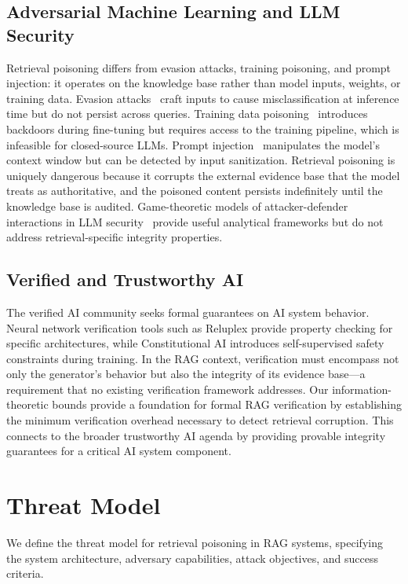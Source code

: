 \documentclass[journal,10pt]{IEEEtran}
\begin{document}
\subsection{Adversarial Machine Learning and LLM Security}
Retrieval poisoning differs from evasion attacks, training poisoning, and prompt injection: it operates on the knowledge base rather than model inputs, weights, or training data. Evasion attacks~\cite{r31} craft inputs to cause misclassification at inference time but do not persist across queries. Training data poisoning~\cite{r32} introduces backdoors during fine-tuning but requires access to the training pipeline, which is infeasible for closed-source LLMs. Prompt injection~\cite{r33} manipulates the model's context window but can be detected by input sanitization. Retrieval poisoning is uniquely dangerous because it corrupts the external evidence base that the model treats as authoritative, and the poisoned content persists indefinitely until the knowledge base is audited. Game-theoretic models of attacker-defender interactions in LLM security~\cite{r34} provide useful analytical frameworks but do not address retrieval-specific integrity properties.

\subsection{Verified and Trustworthy AI}
The verified AI community seeks formal guarantees on AI system behavior. Neural network verification tools such as Reluplex provide property checking for specific architectures, while Constitutional AI introduces self-supervised safety constraints during training. In the RAG context, verification must encompass not only the generator's behavior but also the integrity of its evidence base---a requirement that no existing verification framework addresses. Our information-theoretic bounds provide a foundation for formal RAG verification by establishing the minimum verification overhead necessary to detect retrieval corruption. This connects to the broader trustworthy AI agenda by providing provable integrity guarantees for a critical AI system component.

\section{Threat Model}\label{sec:threat}

We define the threat model for retrieval poisoning in RAG systems, specifying the system architecture, adversary capabilities, attack objectives, and success criteria.
\end{document}
